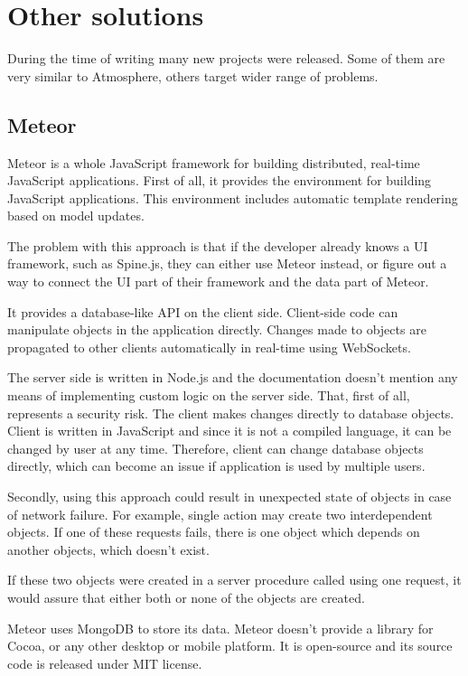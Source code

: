 \section{Other solutions}

During the time of writing many new projects were released. Some of them are very similar to Atmosphere, others target wider range of problems.


\subsection{Meteor}

Meteor \citep{meteor} is a whole JavaScript framework for building distributed, real-time JavaScript applications. First of all, it provides the environment for building JavaScript applications. This environment includes automatic template rendering based on model updates.

The problem with this approach is that if the developer already knows a UI framework, such as Spine.js, \citep{spinejs} they can either use Meteor instead, or figure out a way to connect the UI part of their framework and the data part of Meteor.

It provides a database-like API on the client side. Client-side code can manipulate objects in the application directly. Changes made to objects are propagated to other clients automatically in real-time using WebSockets.

The server side is written in Node.js and the documentation \citep{meteor_doc} doesn't mention any means of implementing custom logic on the server side. That, first of all, represents a security risk. The client makes changes directly to database objects. Client is written in JavaScript and since it is not a compiled language, it can be changed by user at any time. Therefore, client can change database objects directly, which can become an issue if application is used by multiple users.

Secondly, using this approach could result in unexpected state of objects in case of network failure. For example, single action may create two interdependent objects. If one of these requests fails, there is one object which depends on another objects, which doesn't exist.

If these two objects were created in a server procedure called using one request, it would assure that either both or none of the objects are created.

Meteor uses MongoDB to store its data. Meteor doesn't provide a library for Cocoa, or any other desktop or mobile platform. It is open-source and its source code is released under MIT license.

